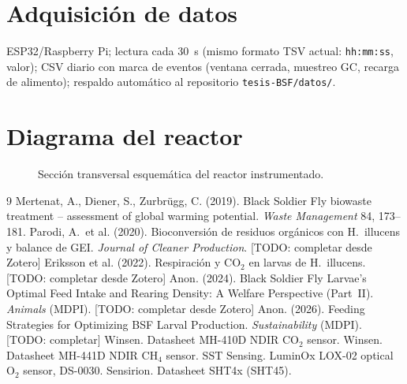 \documentclass[11pt,a4paper]{article}
\begin{document}
\section{Adquisición de datos}

ESP32/Raspberry Pi; lectura cada 30~s (mismo formato TSV actual:
\texttt{hh:mm:ss}, valor); CSV diario con marca de eventos
(ventana cerrada, muestreo GC, recarga de alimento); respaldo
automático al repositorio \texttt{tesis-BSF/datos/}.

\section{Diagrama del reactor}

\begin{figure}[h]
\centering

\caption{Sección transversal esquemática del reactor instrumentado.}
\label{fig:reactor}
\end{figure}

\begin{thebibliography}{9}\small
{} Mertenat, A., Diener, S., Zurbrügg, C. (2019).
Black Soldier Fly biowaste treatment -- assessment of global warming
potential. \emph{Waste Management} 84, 173--181.
 Parodi, A.\ et al. (2020). Bioconversión de
residuos orgánicos con H.~illucens y balance de GEI.
\emph{Journal of Cleaner Production}. [TODO: completar desde Zotero]
 Eriksson et al. (2022). Respiración y CO$_2$
en larvas de H.~illucens. [TODO: completar desde Zotero]
 Anon. (2024). Black Soldier Fly Larvae's
Optimal Feed Intake and Rearing Density: A Welfare Perspective
(Part~II). \emph{Animals} (MDPI). [TODO: completar desde Zotero]
 Anon. (2026). Feeding Strategies for Optimizing
BSF Larval Production. \emph{Sustainability} (MDPI). [TODO: completar]
 Winsen. Datasheet MH-410D NDIR CO$_2$ sensor.
 Winsen. Datasheet MH-441D NDIR CH$_4$ sensor.
 SST Sensing. LuminOx LOX-02 optical O$_2$ sensor,
DS-0030.
 Sensirion. Datasheet SHT4x (SHT45).
\end{thebibliography}
\end{document}

